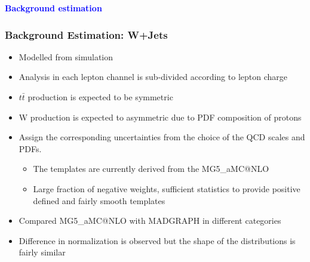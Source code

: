 \documentclass{beamer}
\begin{document}
\begin{frame}
\Huge{\textbf {\textcolor {blue}{Background estimation}}}\\
\end{frame}
\begin{frame}
\frametitle{Background Estimation: W+Jets}
\begin{itemize}
\item Modelled from simulation
\item Analysis in each lepton channel is sub-divided according to lepton charge
\item $t\bar{t}$ production is expected to be symmetric
\item W production is expected to asymmetric due to PDF composition of protons
\item Assign the corresponding uncertainties from the choice of the QCD scales and PDFs.
\begin{itemize}
\item The templates are currently derived from the MG5\_aMC@NLO
\item Large fraction of negative weights, sufficient statistics to provide positive defined and fairly smooth templates
\end{itemize}
\item Compared MG5\_aMC@NLO with MADGRAPH in different categories
\item Difference in normalization is observed but the shape of the distributions is fairly similar
\end{itemize}
\end{frame}
\end{document}
